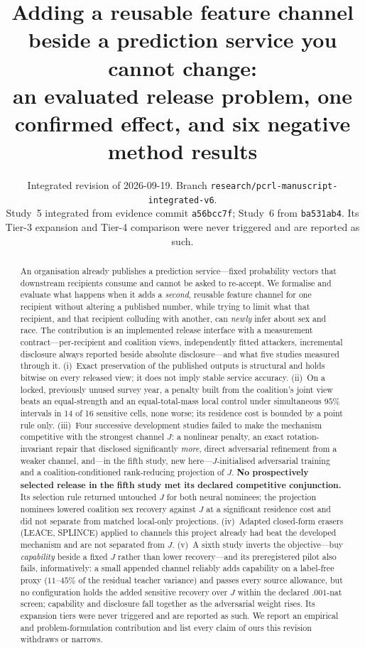 \documentclass[10pt]{article}
\title{Adding a reusable feature channel beside a prediction service you cannot change:\\
an evaluated release problem, one confirmed effect, and six negative method results}
\author{}
\date{Integrated revision of 2026-09-19.
Branch \texttt{research/pcrl-manuscript-integrated-v6}.\\
\small Study~5 integrated from evidence commit \texttt{a56bcc7f}; Study~6 from \texttt{ba531ab4}.
Its Tier-3 expansion and Tier-4 comparison were never triggered and are reported as such.}
\begin{document}
\maketitle

\begin{abstract}
An organisation already publishes a prediction service---fixed probability vectors that downstream
recipients consume and cannot be asked to re-accept. We formalise and evaluate what happens when it
adds a \emph{second}, reusable feature channel for one recipient without altering a published number,
while trying to limit what that recipient, and that recipient colluding with another, can \emph{newly}
infer about sex and race. The contribution is an implemented release interface with a measurement
contract---per-recipient and coalition views, independently fitted attackers, incremental disclosure
always reported beside absolute disclosure---and what five studies measured through it. (i)~Exact
preservation of the published outputs is structural and holds bitwise on every released view; it does
not imply stable service accuracy. (ii)~On a locked, previously unused survey year, a penalty built from
the coalition's joint view beats an equal-strength and an equal-total-mass local control under
simultaneous $95\%$ intervals in 14 of 16 sensitive cells, none worse; its residence cost is bounded by
a point rule only. (iii)~Four successive development studies failed to make the mechanism competitive
with the strongest channel $J$: a nonlinear penalty, an exact rotation-invariant repair that disclosed
significantly \emph{more}, direct adversarial refinement from a weaker channel, and---in the fifth
study, new here---$J$-initialised adversarial training and a coalition-conditioned rank-reducing
projection of $J$. \textbf{No prospectively selected release in the fifth study met its declared
competitive conjunction.} Its selection rule returned untouched $J$ for both neural nominees; the
projection nominees lowered coalition sex recovery against $J$ at a significant residence cost and did
not separate from matched local-only projections. (iv)~Adapted closed-form erasers (LEACE, SPLINCE)
applied to channels this project already had beat the developed mechanism and are not separated from
$J$. (v)~A sixth study inverts the objective---buy \emph{capability} beside a fixed $J$ rather than lower
recovery---and its preregistered pilot also fails, informatively: a small appended channel reliably adds
capability on a label-free proxy ($11$--$45\%$ of the residual teacher variance) and passes every source
allowance, but no configuration holds the added sensitive recovery over $J$ within the declared $.001$-nat
screen; capability and disclosure fall together as the adversarial weight rises. Its expansion tiers were
never triggered and are reported as such. We report an empirical and problem-formulation contribution and
list every claim of ours this revision withdraws or narrows.
\end{abstract}
\end{document}

